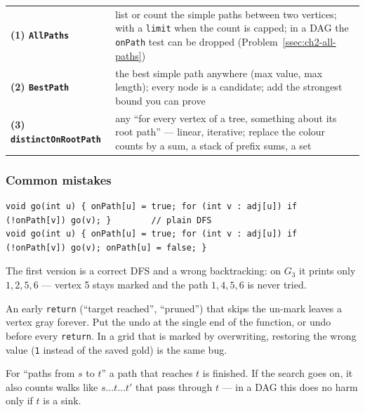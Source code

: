 \begin{insightbox}
\renewcommand{\arraystretch}{1.25}
\begin{tabularx}{\linewidth}{@{}>{\bfseries}l X@{}}
(1) \texttt{AllPaths} & list or count the simple paths between two vertices; with a \texttt{limit} when the count is capped; in a DAG the \texttt{onPath} test can be dropped (Problem~\ref{ssec:ch2-all-paths}) \\
(2) \texttt{BestPath} & the best simple path anywhere (max value, max length); every node is a candidate; add the strongest bound you can prove \\
(3) \texttt{distinctOnRootPath} & any ``for every vertex of a tree, something about its root path'' --- linear, iterative; replace the colour counts by a sum, a stack of prefix sums, a set \\
\end{tabularx}
\end{insightbox}

\subsubsection*{Common mistakes}

\begin{warningbox}
\begin{lstlisting}[style=snippet]
void go(int u) { onPath[u] = true; for (int v : adj[u]) if (!onPath[v]) go(v); }        // plain DFS
void go(int u) { onPath[u] = true; for (int v : adj[u]) if (!onPath[v]) go(v); onPath[u] = false; }
\end{lstlisting}
The first version is a correct DFS and a wrong backtracking: on $G_3$ it prints only $1, 2, 5, 6$ --- vertex 5 stays marked and the path $1, 4, 5, 6$ is never tried.
\end{warningbox}

\begin{warningbox}
An early \texttt{return} (``target reached'', ``pruned'') that skips the un-mark leaves a vertex gray forever. Put the undo at the single end of the function, or undo before every \texttt{return}. In a grid that is marked by overwriting, restoring the wrong value (\texttt{1} instead of the saved gold) is the same bug.
\end{warningbox}

\begin{warningbox}
For ``paths from $s$ to $t$'' a path that reaches $t$ is finished. If the search goes on, it also counts walks like $s \dots t \dots t'$ that pass through $t$ --- in a DAG this does no harm only if $t$ is a sink.
\end{warningbox}

